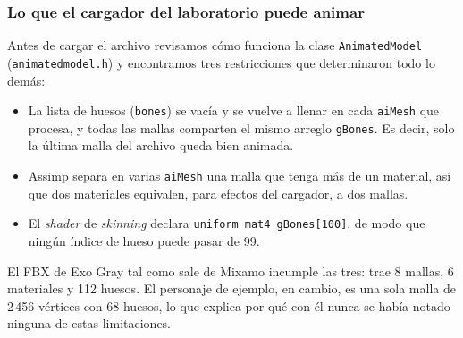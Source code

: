 \subsubsection{Lo que el cargador del laboratorio puede animar}
Antes de cargar el archivo revisamos cómo funciona la clase \texttt{AnimatedModel} (\texttt{animatedmodel.h}) y encontramos tres restricciones que determinaron todo lo demás:
\begin{itemize}
    \item La lista de huesos (\texttt{bones}) se vacía y se vuelve a llenar en cada \texttt{aiMesh} que procesa, y todas las mallas comparten el mismo arreglo \texttt{gBones}. Es decir, solo la última malla del archivo queda bien animada.
    \item Assimp separa en varias \texttt{aiMesh} una malla que tenga más de un material, así que dos materiales equivalen, para efectos del cargador, a dos mallas.
    \item El \textit{shader} de \textit{skinning} declara \texttt{uniform mat4 gBones[100]}, de modo que ningún índice de hueso puede pasar de 99.
\end{itemize}
El FBX de Exo Gray tal como sale de Mixamo incumple las tres: trae 8 mallas, 6 materiales y 112 huesos. El personaje de ejemplo, en cambio, es una sola malla de 2\,456 vértices con 68 huesos, lo que explica por qué con él nunca se había notado ninguna de estas limitaciones.

